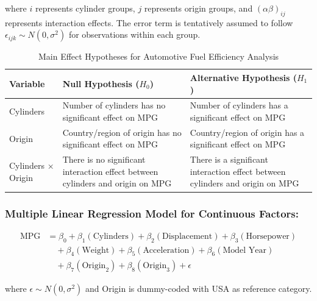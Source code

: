 \documentclass[12pt]{article}
\begin{document}
\noindent where $i$ represents cylinder groups, $j$ represents origin groups, and $(\alpha\beta)_{ij}$ represents interaction effects.
The error term is tentatively assumed to follow \(\epsilon_{ijk} \sim N(0,\sigma^2)\) for observations within each group.

\begin{table}[h]
\centering
\caption{Main Effect Hypotheses for Automotive Fuel Efficiency Analysis}
\label{tab:main_hypotheses}
\begin{tabular}{p{2.5cm}p{6cm}p{6cm}}
\toprule
\textbf{Variable} & \textbf{Null Hypothesis ($H_0$)} & \textbf{Alternative Hypothesis ($H_1$)} \\
\midrule
Cylinders & Number of cylinders has no significant effect on MPG & Number of cylinders has a significant effect on MPG \\
\midrule
Origin & Country/region of origin has no significant effect on MPG & Country/region of origin has a significant effect on MPG \\
\midrule
Cylinders × Origin & There is no significant interaction effect between cylinders and origin on MPG & There is a significant interaction effect between cylinders and origin on MPG \\
\bottomrule
\end{tabular}
\end{table}

\subsubsection{Multiple Linear Regression Model for Continuous Factors:}

\begin{align}
\text{MPG} &= \beta_0 + \beta_1(\text{Cylinders}) + \beta_2(\text{Displacement}) + \beta_3(\text{Horsepower}) \nonumber \\
&\quad + \beta_4(\text{Weight}) + \beta_5(\text{Acceleration}) + \beta_6(\text{Model Year}) \nonumber \\
&\quad + \beta_7(\text{Origin}_2) + \beta_8(\text{Origin}_3) + \epsilon
\end{align}

\noindent where $\epsilon \sim N(0,\sigma^2)$ and Origin is dummy-coded with USA as reference category.
\end{document}
